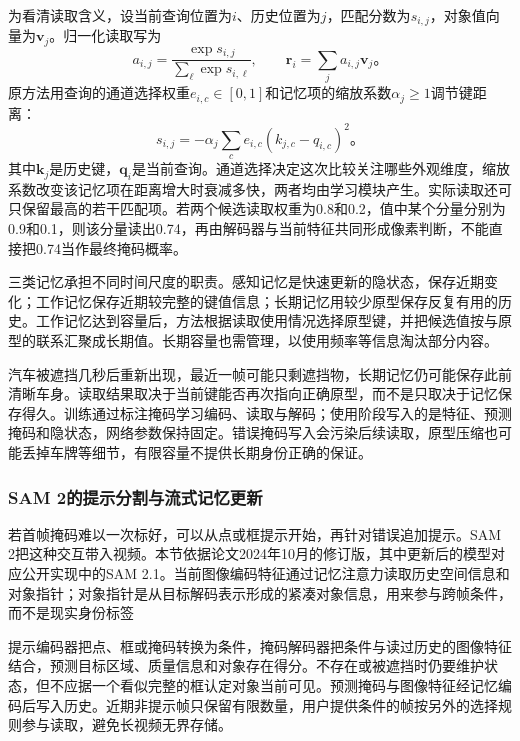 为看清读取含义，设当前查询位置为$i$、历史位置为$j$，匹配分数为$s_{i,j}$，对象值向量为$\bm{v}_j$。归一化读取写为
\begin{equation}
  a_{i,j}=\frac{\exp s_{i,j}}{\sum_\ell\exp s_{i,\ell}},
  \qquad
  \bm{r}_i=\sum_j a_{i,j}\bm{v}_j\text{。}
  \label{eq:vision-video-memory-read}
\end{equation}
原方法用查询的通道选择权重$e_{i,c}\in[0,1]$和记忆项的缩放系数$\alpha_j\geq1$调节键距离：
\[
  s_{i,j}=-\alpha_j\sum_c e_{i,c}(k_{j,c}-q_{i,c})^2\text{。}
\]
其中$\bm{k}_j$是历史键，$\bm{q}_i$是当前查询。通道选择决定这次比较关注哪些外观维度，缩放系数改变该记忆项在距离增大时衰减多快，两者均由学习模块产生。实际读取还可只保留最高的若干匹配项。若两个候选读取权重为0.8和0.2，值中某个分量分别为0.9和0.1，则该分量读出0.74，再由解码器与当前特征共同形成像素判断，不能直接把0.74当作最终掩码概率。

三类记忆承担不同时间尺度的职责。感知记忆是快速更新的隐状态，保存近期变化；工作记忆保存近期较完整的键值信息；长期记忆用较少原型保存反复有用的历史。工作记忆达到容量后，方法根据读取使用情况选择原型键，并把候选值按与原型的联系汇聚成长期值。长期容量也需管理，以使用频率等信息淘汰部分内容。

汽车被遮挡几秒后重新出现，最近一帧可能只剩遮挡物，长期记忆仍可能保存此前清晰车身。读取结果取决于当前键能否再次指向正确原型，而不是只取决于记忆保存得久。训练通过标注掩码学习编码、读取与解码；使用阶段写入的是特征、预测掩码和隐状态，网络参数保持固定。错误掩码写入会污染后续读取，原型压缩也可能丢掉车牌等细节，有限容量不提供长期身份正确的保证。

\subsubsection{SAM 2的提示分割与流式记忆更新}
\label{sec:vision-video-sam2}

若首帧掩码难以一次标好，可以从点或框提示开始，再针对错误追加提示。SAM 2把这种交互带入视频。本节依据论文2024年10月的修订版，其中更新后的模型对应公开实现中的SAM 2.1。当前图像编码特征通过记忆注意力读取历史空间信息和对象指针；对象指针是从目标解码表示形成的紧凑对象信息，用来参与跨帧条件，而不是现实身份标签

提示编码器把点、框或掩码转换为条件，掩码解码器把条件与读过历史的图像特征结合，预测目标区域、质量信息和对象存在得分。不存在或被遮挡时仍要维护状态，但不应据一个看似完整的框认定对象当前可见。预测掩码与图像特征经记忆编码后写入历史。近期非提示帧只保留有限数量，用户提供条件的帧按另外的选择规则参与读取，避免长视频无界存储。

